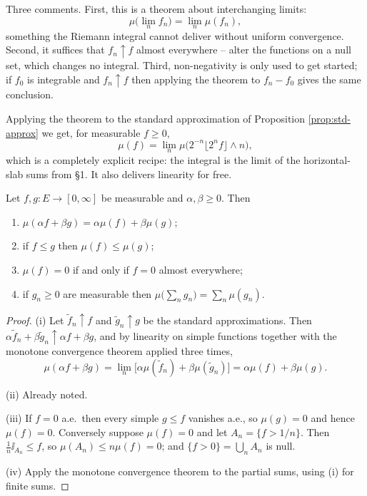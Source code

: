 \documentclass[a4paper]{scrartcl}
\newcommand{\ind}{\ii}
\begin{document}
\begin{remark}
	Three comments. First, this is a theorem about interchanging limits:
	$$
	\mu\big(\lim_n f_n\big) = \lim_n \mu(f_n),
	$$
	something the Riemann integral cannot deliver without uniform convergence. Second, it suffices that $f_n \uparrow f$ almost everywhere -- alter the functions on a null set, which changes no integral. Third, non-negativity is only used to get started; if $f_0$ is integrable and $f_n \uparrow f$ then applying the theorem to $f_n - f_0$ gives the same conclusion.
\end{remark}

Applying the theorem to the standard approximation of Proposition \ref{prop:std-approx} we get, for measurable $f \geq 0$,
$$
\mu(f) = \lim_n \mu\big( 2^{-n}\lfloor 2^n f\rfloor \wedge n \big),
$$
which is a completely explicit recipe: the integral is the limit of the horizontal-slab sums from \S1. It also delivers linearity for free.

\begin{theorem}\label{thm:int-nonneg}
	Let $f, g : E \to [0,\infty]$ be measurable and $\alpha, \beta \geq 0$. Then
	\begin{enumerate}[label=(\roman*)]
		\item $\mu(\alpha f + \beta g) = \alpha \mu(f) + \beta\mu(g)$;
		\item if $f \leq g$ then $\mu(f) \leq \mu(g)$;
		\item $\mu(f) = 0$ if and only if $f = 0$ almost everywhere;
		\item if $g_n \geq 0$ are measurable then $\mu\big(\sum_n g_n\big) = \sum_n \mu(g_n)$.
	\end{enumerate}
\end{theorem}
\begin{proof}
	(i) Let $\tilde f_n \uparrow f$ and $\tilde g_n \uparrow g$ be the standard approximations. Then $\alpha \tilde f_n + \beta\tilde g_n \uparrow \alpha f + \beta g$, and by linearity on simple functions together with the monotone convergence theorem applied three times,
	$$
	\mu(\alpha f + \beta g) = \lim_n \big[\alpha\mu(\tilde f_n) + \beta \mu(\tilde g_n)\big] = \alpha\mu(f)+\beta\mu(g).
	$$

	(ii) Already noted.

	(iii) If $f = 0$ a.e.\ then every simple $g \leq f$ vanishes a.e., so $\mu(g)=0$ and hence $\mu(f)=0$. Conversely suppose $\mu(f)=0$ and let $A_n = \{f > 1/n\}$. Then $\frac1n \ind_{A_n} \leq f$, so $\mu(A_n) \leq n\mu(f) = 0$; and $\{f>0\} = \bigcup_n A_n$ is null.

	(iv) Apply the monotone convergence theorem to the partial sums, using (i) for finite sums.
\end{proof}
\end{document}
